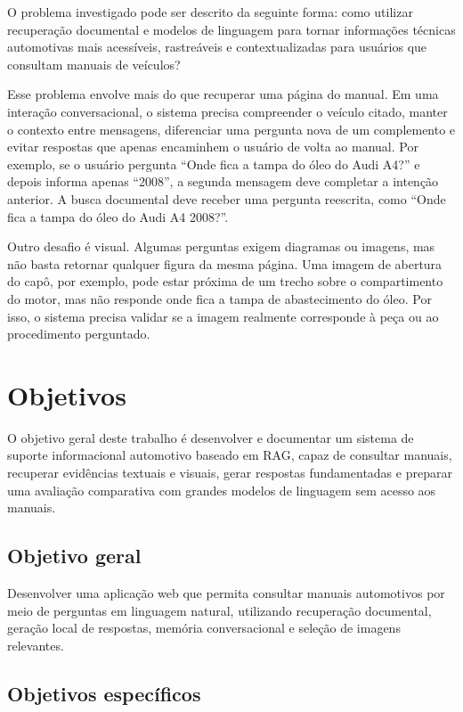 O problema investigado pode ser descrito da seguinte forma: como utilizar recuperação documental e modelos de linguagem para tornar informações técnicas automotivas mais acessíveis, rastreáveis e contextualizadas para usuários que consultam manuais de veículos?

Esse problema envolve mais do que recuperar uma página do manual. Em uma interação conversacional, o sistema precisa compreender o veículo citado, manter o contexto entre mensagens, diferenciar uma pergunta nova de um complemento e evitar respostas que apenas encaminhem o usuário de volta ao manual. Por exemplo, se o usuário pergunta ``Onde fica a tampa do óleo do Audi A4?'' e depois informa apenas ``2008'', a segunda mensagem deve completar a intenção anterior. A busca documental deve receber uma pergunta reescrita, como ``Onde fica a tampa do óleo do Audi A4 2008?''.

Outro desafio é visual. Algumas perguntas exigem diagramas ou imagens, mas não basta retornar qualquer figura da mesma página. Uma imagem de abertura do capô, por exemplo, pode estar próxima de um trecho sobre o compartimento do motor, mas não responde onde fica a tampa de abastecimento do óleo. Por isso, o sistema precisa validar se a imagem realmente corresponde à peça ou ao procedimento perguntado.

\section{Objetivos}
\label{sec:objetivos}

O objetivo geral deste trabalho é desenvolver e documentar um sistema de suporte informacional automotivo baseado em RAG, capaz de consultar manuais, recuperar evidências textuais e visuais, gerar respostas fundamentadas e preparar uma avaliação comparativa com grandes modelos de linguagem sem acesso aos manuais.

\subsection{Objetivo geral}

Desenvolver uma aplicação web que permita consultar manuais automotivos por meio de perguntas em linguagem natural, utilizando recuperação documental, geração local de respostas, memória conversacional e seleção de imagens relevantes.

\subsection{Objetivos específicos}

